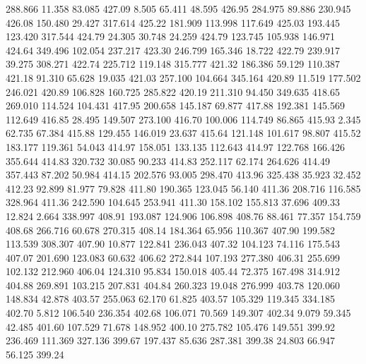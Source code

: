  288.866   11.358   83.085       427.09
   8.505   65.411   48.595       426.95
 284.975   89.886  230.945       426.08
 150.480   29.427  317.614       425.22
 181.909  113.998  117.649       425.03
 193.445  123.420  317.544       424.79
  24.305   30.748   24.259       424.79
 123.745  105.938  146.971       424.64
 349.496  102.054  237.217       423.30
 246.799  165.346   18.722       422.79
 239.917   39.275  308.271       422.74
 225.712  119.148  315.777       421.32
 186.386   59.129  110.387       421.18
  91.310   65.628   19.035       421.03
 257.100  104.664  345.164       420.89
  11.519  177.502  246.021       420.89
 106.828  160.725  285.822       420.19
 211.310   94.450  349.635       418.65
 269.010  114.524  104.431       417.95
 200.658  145.187   69.877       417.88
 192.381  145.569  112.649       416.85
  28.495  149.507  273.100       416.70
 100.006  114.749   86.865       415.93
   2.345   62.735   67.384       415.88
 129.455  146.019   23.637       415.64
 121.148  101.617   98.807       415.52
 183.177  119.361   54.043       414.97
 158.051  133.135  112.643       414.97
 122.768  166.426  355.644       414.83
 320.732   30.085   90.233       414.83
 252.117   62.174  264.626       414.49
 357.443   87.202   50.984       414.15
 202.576   93.005  298.470       413.96
 325.438   35.923   32.452       412.23
  92.899   81.977   79.828       411.80
 190.365  123.045   56.140       411.36
 208.716  116.585  328.964       411.36
 242.590  104.645  253.941       411.30
 158.102  155.813   37.696       409.33
  12.824    2.664  338.997       408.91
 193.087  124.906  106.898       408.76
  88.461   77.357  154.759       408.68
 266.716   60.678  270.315       408.14
 184.364   65.956  110.367       407.90
 199.582  113.539  308.307       407.90
  10.877  122.841  236.043       407.32
 104.123   74.116  175.543       407.07
 201.690  123.083   60.632       406.62
 272.844  107.193  277.380       406.31
 255.699  102.132  212.960       406.04
 124.310   95.834  150.018       405.44
  72.375  167.498  314.912       404.88
 269.891  103.215  207.831       404.84
 260.323   19.048  276.999       403.78
 120.060  148.834   42.878       403.57
 255.063   62.170   61.825       403.57
 105.329  119.345  334.185       402.70
   5.812  106.540  236.354       402.68
 106.071   70.569  149.307       402.34
   9.079   59.345   42.485       401.60
 107.529   71.678  148.952       400.10
 275.782  105.476  149.551       399.92
 236.469  111.369  327.136       399.67
 197.437   85.636  287.381       399.38
  24.803   66.947   56.125       399.24

